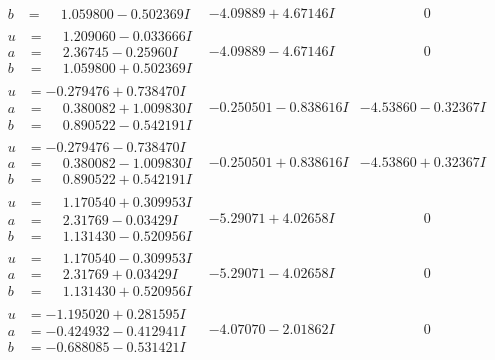 \documentclass[1p]{elsarticle_modified}
\theoremstyle{definition}
\begin{document}
$$\begin{array}{c|c|c}
\begin{aligned}
b &= \phantom{-}1.059800 - 0.502369 I\end{aligned}
 & -4.09889 + 4.67146 I & \phantom{-0.000000 } 0 \\ \hline\begin{aligned}
u &= \phantom{-}1.209060 - 0.033666 I \\
a &= \phantom{-}2.36745 - 0.25960 I \\
b &= \phantom{-}1.059800 + 0.502369 I\end{aligned}
 & -4.09889 - 4.67146 I & \phantom{-0.000000 } 0 \\ \hline\begin{aligned}
u &= -0.279476 + 0.738470 I \\
a &= \phantom{-}0.380082 + 1.009830 I \\
b &= \phantom{-}0.890522 - 0.542191 I\end{aligned}
 & -0.250501 - 0.838616 I & -4.53860 - 0.32367 I \\ \hline\begin{aligned}
u &= -0.279476 - 0.738470 I \\
a &= \phantom{-}0.380082 - 1.009830 I \\
b &= \phantom{-}0.890522 + 0.542191 I\end{aligned}
 & -0.250501 + 0.838616 I & -4.53860 + 0.32367 I \\ \hline\begin{aligned}
u &= \phantom{-}1.170540 + 0.309953 I \\
a &= \phantom{-}2.31769 - 0.03429 I \\
b &= \phantom{-}1.131430 - 0.520956 I\end{aligned}
 & -5.29071 + 4.02658 I & \phantom{-0.000000 } 0 \\ \hline\begin{aligned}
u &= \phantom{-}1.170540 - 0.309953 I \\
a &= \phantom{-}2.31769 + 0.03429 I \\
b &= \phantom{-}1.131430 + 0.520956 I\end{aligned}
 & -5.29071 - 4.02658 I & \phantom{-0.000000 } 0 \\ \hline\begin{aligned}
u &= -1.195020 + 0.281595 I \\
a &= -0.424932 - 0.412941 I \\
b &= -0.688085 - 0.531421 I\end{aligned}
 & -4.07070 - 2.01862 I & \phantom{-0.000000 } 0 \\ \hline\begin{aligned}

\end{aligned}
\end{array}$$
\end{document}
